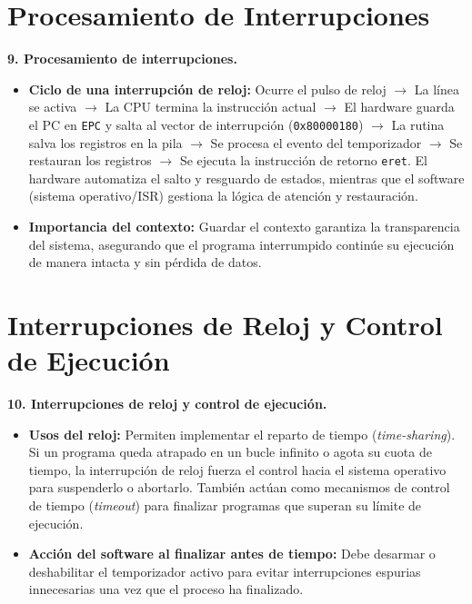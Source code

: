 \documentclass[12pt,a4paper]{article}
\begin{document}
\section{Procesamiento de Interrupciones} 
\textbf{9. Procesamiento de interrupciones.} 

\begin{itemize}
    \item[a)] \textbf{Ciclo de una interrupción de reloj:} Ocurre el pulso de reloj $\rightarrow$ La línea se activa $\rightarrow$ La CPU termina la instrucción actual $\rightarrow$ El hardware guarda el PC en \texttt{EPC} y salta al vector de interrupción (\texttt{0x80000180}) $\rightarrow$ La rutina salva los registros en la pila $\rightarrow$ Se procesa el evento del temporizador $\rightarrow$ Se restauran los registros $\rightarrow$ Se ejecuta la instrucción de retorno \texttt{eret}. El hardware automatiza el salto y resguardo de estados, mientras que el software (sistema operativo/ISR) gestiona la lógica de atención y restauración. 
    
    \item[b)] \textbf{Importancia del contexto:} Guardar el contexto garantiza la transparencia del sistema, asegurando que el programa interrumpido continúe su ejecución de manera intacta y sin pérdida de datos. 
\end{itemize}


\section{Interrupciones de Reloj y Control de Ejecución}
\textbf{10. Interrupciones de reloj y control de ejecución.} 

\begin{itemize}
    \item[a)] \textbf{Usos del reloj:} Permiten implementar el reparto de tiempo (\textit{time-sharing}). Si un programa queda atrapado en un bucle infinito o agota su cuota de tiempo, la interrupción de reloj fuerza el control hacia el sistema operativo para suspenderlo o abortarlo. También actúan como mecanismos de control de tiempo (\textit{timeout}) para finalizar programas que superan su límite de ejecución. 
    
    \item[b)] \textbf{Acción del software al finalizar antes de tiempo:} Debe desarmar o deshabilitar el temporizador activo para evitar interrupciones espurias innecesarias una vez que el proceso ha finalizado.
\end{itemize}
\end{document}
